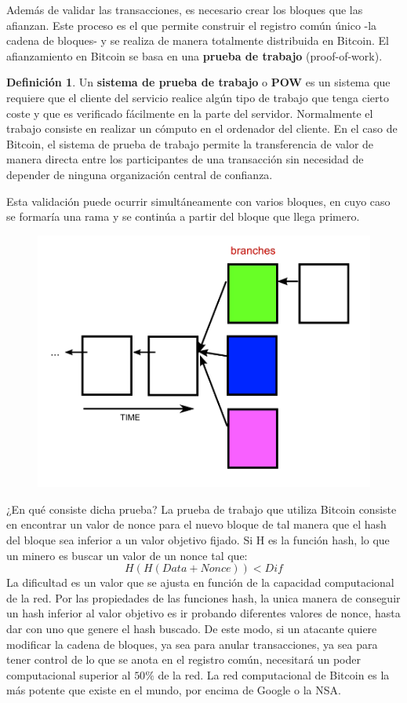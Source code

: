 \documentclass[twoside]{article}
\theoremstyle{definition}
\newtheorem{defi}[teorema]{Definición}
\begin{document}
Además de validar las transacciones, es necesario crear los bloques que las afianzan. Este proceso es el que permite construir el registro común único  -la cadena de bloques- y se realiza de manera totalmente distribuida en Bitcoin. El afianzamiento en Bitcoin se basa en una \textbf{prueba de trabajo} (proof-of-work). 
\begin{defi} Un \textbf{sistema de prueba de trabajo} o \textbf{POW} es un sistema que requiere que el cliente del servicio realice algún tipo de trabajo que tenga cierto coste y que es verificado fácilmente en la parte del servidor. Normalmente el trabajo consiste en realizar un cómputo en el ordenador del cliente. En el caso de Bitcoin, el sistema de prueba de trabajo permite la transferencia de valor de manera directa entre los participantes de una transacción sin necesidad de depender de ninguna organización central de confianza. 
\end{defi}
Esta validación puede ocurrir simultáneamente con varios bloques, en cuyo caso se formaría una rama y se continúa a partir del bloque que llega primero.
\begin{figure}[h!]
\includegraphics[scale=0.45]{rama}
\end{figure}

¿En qué consiste dicha prueba? La prueba de trabajo que utiliza Bitcoin consiste en encontrar un valor de nonce para el nuevo bloque de tal manera que el
hash del bloque sea inferior a un valor objetivo fijado. Si H es la función hash, lo que un minero es buscar un valor de un nonce tal que:
\[
H(H(Data+Nonce)) < Dif
\]
La dificultad es un valor que se ajusta en función de la capacidad computacional de la red. Por las propiedades de las funciones hash, la unica manera de conseguir un hash inferior al valor objetivo es ir probando diferentes valores de nonce, hasta dar con uno que genere el hash buscado. De este modo, si un atacante quiere modificar la cadena de bloques, ya sea para anular transacciones, ya sea para tener control de lo que se anota en el registro común, necesitará un poder computacional superior al $50\%$ de la red. La red computacional de Bitcoin es la más potente que existe en el mundo, por encima de Google o la NSA.
\end{document}
